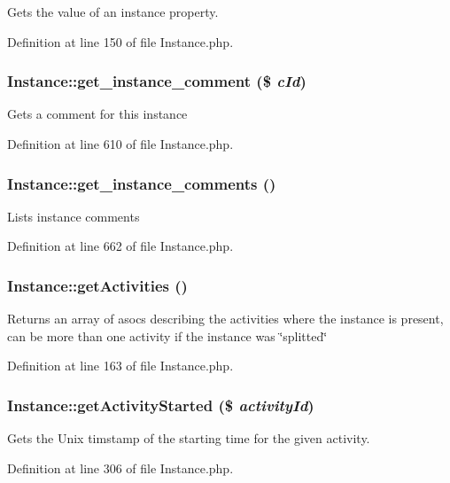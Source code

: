 Gets the value of an instance property. 

Definition at line 150 of file Instance.php.
\subsubsection{\setlength{\rightskip}{0pt plus 5cm}Instance::get\_\-instance\_\-comment (\$ {\em c\-Id})}\label{classInstance_a26}


Gets a comment for this instance 

Definition at line 610 of file Instance.php.
\subsubsection{\setlength{\rightskip}{0pt plus 5cm}Instance::get\_\-instance\_\-comments ()}\label{classInstance_a29}


Lists instance comments 

Definition at line 662 of file Instance.php.
\subsubsection{\setlength{\rightskip}{0pt plus 5cm}Instance::get\-Activities ()}\label{classInstance_a6}


Returns an array of asocs describing the activities where the instance is present, can be more than one activity if the instance was \char`\"{}splitted\char`\"{} 

Definition at line 163 of file Instance.php.
\subsubsection{\setlength{\rightskip}{0pt plus 5cm}Instance::get\-Activity\-Started (\$ {\em activity\-Id})}\label{classInstance_a18}


Gets the Unix timstamp of the starting time for the given activity. 

Definition at line 306 of file Instance.php.
